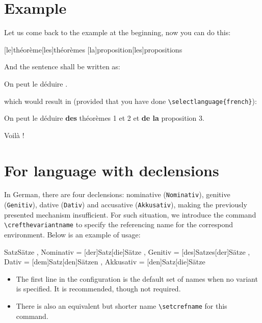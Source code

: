 \documentclass[classical]{einfart}
\newenvironment{tip}[1][Tip]
  {%
    \LocallyStopLineNumbers%
    \begin{tcolorbox}[breakable,
        enhanced,
        width = \textwidth,
        colback = paper, colbacktitle = paper,
        colframe = gray!50, boxrule=0.2mm,
        coltitle = black,
        fonttitle = \sffamily,
        attach boxed title to top left = {yshift=-\tcboxedtitleheight/2, xshift=.5cm},
        boxed title style = {boxrule=0pt, colframe=paper},
        before skip = 3mm,
        after skip = 3mm,
        top = 2.5mm,
        bottom = 1.5mm,
        title={\scshape\sffamily #1}]%
  }
  {%
    \end{tcolorbox}%
    \ResumeLineNumbers%
  }
\newenvironment{demo}
  {%
    \LocallyStopLineNumbers%
    \begin{tcolorbox}[enhanced jigsaw,pad at break*=1mm,breakable,
        left=2.5mm,right=3mm,top=0.5mm,bottom=0mm,
        colback=gray!5!paper,boxrule=0pt,frame hidden,
        borderline west={1.2mm}{0mm}{gray!55!paper},arc=.7mm]%
  }
  {%
    \end{tcolorbox}%
    \ResumeLineNumbers%
  }
\begin{document}


\section{Example}

Let us come back to the example at the beginning, now you can do this:

\begin{code}
[le]{théorème}[les]{théorèmes}
[la]{proposition}[les]{propositions}
\end{code}

And the sentence shall be written as:

\begin{code}
On peut le déduire .
\end{code}

which would result in (provided that you have done \lstinline|\selectlanguage{french}|):

\begin{demo}
    On peut le déduire \textbf{des} théorèmes 1 et 2 et \textbf{de la} proposition 3.
\end{demo}

Voilà !

\section{For language with declensions}

In German, there are four declensions: nominative (\texttt{Nominativ}), genitive (\texttt{Genitiv}), dative (\texttt{Dativ}) and accusative (\texttt{Akkusativ}), making the previously presented mechanism insufficient. For such situation, we introduce the command \lstinline|\crefthevariantname| to specify the referencing name for the correspond environment. Below is an example of usage:

\begin{code}
  {
    {Satz}{Sätze}
    , Nominativ = [der]{Satz}[die]{Sätze}
    , Genitiv   = [des]{Satzes}[der]{Sätze}
    , Dativ     = [dem]{Satz}[den]{Sätzen}
    , Akkusativ = [den]{Satz}[die]{Sätze}
  }
\end{code}

\begin{tip}
    \begin{itemize}
        \item The first line in the configuration is the default set of names when no variant is specified. It is recommended, though not required.
        \item There is also an equivalent but shorter name \lstinline|\setcrefname| for this command.
    \end{itemize}
\end{tip}
\end{document}
